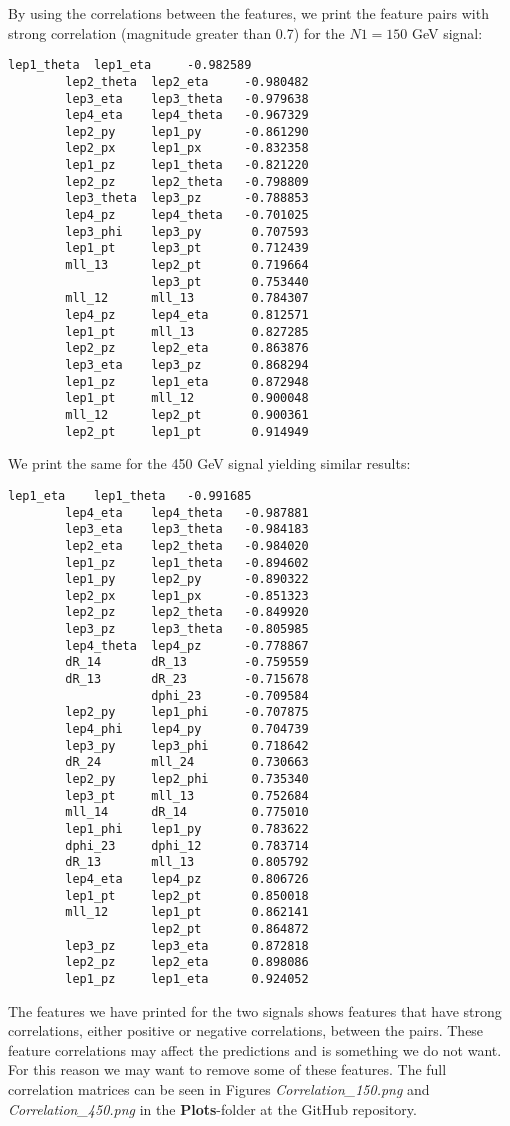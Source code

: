 \documentclass[a4paper, american, 12pt]{report}
\begin{document}
	By using the correlations between the features, we print the feature pairs with strong correlation (magnitude greater than 0.7) for the $N1=150$ GeV signal:
	\begin{lstlisting}[caption=Feature correlation 150 GeV signal,label=Feature150]
		lep1_theta  lep1_eta     -0.982589
		lep2_theta  lep2_eta     -0.980482
		lep3_eta    lep3_theta   -0.979638
		lep4_eta    lep4_theta   -0.967329
		lep2_py     lep1_py      -0.861290
		lep2_px     lep1_px      -0.832358
		lep1_pz     lep1_theta   -0.821220
		lep2_pz     lep2_theta   -0.798809
		lep3_theta  lep3_pz      -0.788853
		lep4_pz     lep4_theta   -0.701025
		lep3_phi    lep3_py       0.707593
		lep1_pt     lep3_pt       0.712439
		mll_13      lep2_pt       0.719664
					lep3_pt       0.753440
		mll_12      mll_13        0.784307
		lep4_pz     lep4_eta      0.812571
		lep1_pt     mll_13        0.827285
		lep2_pz     lep2_eta      0.863876
		lep3_eta    lep3_pz       0.868294
		lep1_pz     lep1_eta      0.872948
		lep1_pt     mll_12        0.900048
		mll_12      lep2_pt       0.900361
		lep2_pt     lep1_pt       0.914949
	\end{lstlisting}
	We print the same for the 450 GeV signal yielding similar results:
	\begin{lstlisting}[caption=Feature correlation 450 GeV signal.,label=Feature450]
		lep1_eta    lep1_theta   -0.991685
		lep4_eta    lep4_theta   -0.987881
		lep3_eta    lep3_theta   -0.984183
		lep2_eta    lep2_theta   -0.984020
		lep1_pz     lep1_theta   -0.894602
		lep1_py     lep2_py      -0.890322
		lep2_px     lep1_px      -0.851323
		lep2_pz     lep2_theta   -0.849920
		lep3_pz     lep3_theta   -0.805985
		lep4_theta  lep4_pz      -0.778867
		dR_14       dR_13        -0.759559
		dR_13       dR_23        -0.715678
					dphi_23      -0.709584
		lep2_py     lep1_phi     -0.707875
		lep4_phi    lep4_py       0.704739
		lep3_py     lep3_phi      0.718642
		dR_24       mll_24        0.730663
		lep2_py     lep2_phi      0.735340
		lep3_pt     mll_13        0.752684
		mll_14      dR_14         0.775010
		lep1_phi    lep1_py       0.783622
		dphi_23     dphi_12       0.783714
		dR_13       mll_13        0.805792
		lep4_eta    lep4_pz       0.806726
		lep1_pt     lep2_pt       0.850018
		mll_12      lep1_pt       0.862141
					lep2_pt       0.864872
		lep3_pz     lep3_eta      0.872818
		lep2_pz     lep2_eta      0.898086
		lep1_pz     lep1_eta      0.924052
	\end{lstlisting} 
	The features we have printed for the two signals shows features that have strong correlations, either positive or negative correlations, between the pairs. These feature correlations may affect the predictions and is something we do not want. For this reason we may want to remove some of these features. The full correlation matrices can be seen in Figures \textit{Correlation\_150.png} and \textit{Correlation\_450.png} in the \textbf{Plots}-folder at the GitHub repository. 
		
\end{document}
